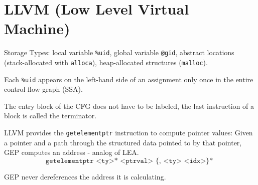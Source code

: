 \section*{LLVM (Low Level Virtual Machine)}

Storage Types: local variable \texttt{\%uid}, global variable \texttt{@gid}, abstract locations (stack-allocated with \texttt{alloca}), heap-allocated structures (\texttt{malloc}).\medskip
	
Each \texttt{\%uid} appears on the left-hand side of an assignment only once in the entire control flow graph (SSA).\medskip
	
The entry block of the CFG does not have to be labeled, the last instruction of a block is called the terminator.\medskip
	
LLVM provides the \texttt{getelementptr} instruction to compute pointer values: Given a pointer and a path through the structured data pointed to by that pointer, GEP computes an address - analog of LEA.
$$\texttt{getelementptr <ty>* <ptrval> \{, <ty> <idx>\}* }$$
		
GEP never dereferences the address it is calculating.
